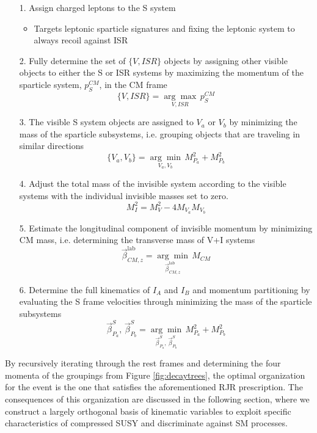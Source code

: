 \begin{itemize}
\item[1.] Assign charged leptons to the S system
\begin{itemize}
	\item Targets leptonic sparticle signatures and fixing the leptonic system to always recoil against ISR
\end{itemize}
\item[2.] Fully determine the set of $\{V,ISR\}$ objects by assigning other visible objects to either the S or ISR systems by maximizing the momentum of the sparticle system, $p_S^{CM}$, in the CM frame
\begin{equation}
\{V,ISR\} =  \underset{V,ISR}{\arg\max} \, p_S^{CM}
\end{equation}
\item[3.] The visible S system objects are assigned to $V_a$ or $V_b$ by minimizing the mass of the sparticle subsystems, i.e. grouping objects that are traveling in similar directions
\begin{equation}
\{V_a,V_b\} = \underset{V_a,V_b}{\arg\min} \, M_{P_a}^2 + M_{P_b}^2
\end{equation}
\item[4.] Adjust the total mass of the invisible system according to the visible systems with the individual invisible masses set to zero.
\begin{equation}
M_I^2 = M_V^2 - 4M_{V_a}M_{V_b}
\end{equation}
\item[5.] Estimate the longitudinal component of invisible momentum by minimizing CM mass, i.e. determining the transverse mass of V+I systems
\begin{equation}
 \vec{\beta}_{CM,z}^{\text{lab}} = \underset{\vec{\beta}_{CM,z}^{\text{lab}} } {\arg\min} \, M_{CM}
\end{equation}
\item[6.] Determine the full kinematics of $I_A$ and $I_B$ and momentum partitioning  by evaluating the S frame velocities through minimizing the mass of the sparticle subsystems
\begin{equation}
\vec{\beta}_{P_a}^S, \, \vec{\beta}_{P_b}^S = \underset{\vec{\beta}_{P_a}^S, \, \vec{\beta}_{P_b}^S}{\arg\min} \, M_{P_a}^2 + M_{P_b}^2
\end{equation}
\end{itemize}

By recursively iterating through the rest frames and determining the four momenta of the groupings from Figure \ref{fig:decaytrees}, the optimal organization for the event is the one that satisfies the aforementioned RJR prescription. The consequences of this organization are discussed in the following section, where we construct a largely orthogonal basis of kinematic variables to exploit specific characteristics of compressed SUSY and discriminate against SM processes.



